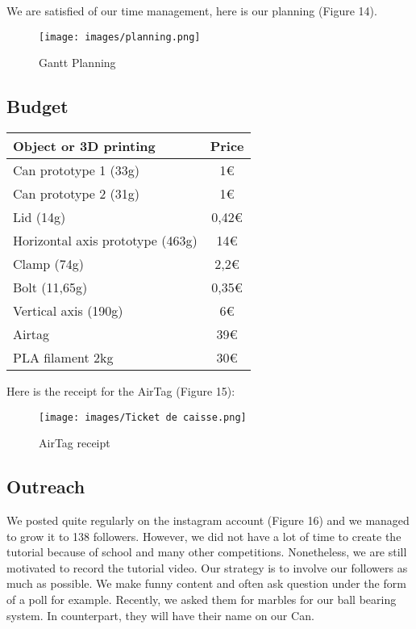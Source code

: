 \documentclass[]{article}
\begin{document}
We are satisfied of our time management, here is our planning (Figure 14). 

\begin{figure}[h] 
    \centering
    \texttt{[image: images/planning.png]} 
    \caption{Gantt Planning}
\end{figure}

\subsection{Budget}

\begin{center}
    \begin{tabular}{|l|c|}
        \hline
        \textbf{Object or 3D printing} & \textbf{Price} \\
        \hline
        Can prototype 1 (33g) & 1€ \\
        \hline
        Can prototype 2 (31g) & 1€ \\
        \hline
        Lid (14g) & 0,42€ \\
        \hline
        Horizontal axis prototype (463g) & 14€ \\
        \hline
        Clamp (74g) & 2,2€ \\
        \hline
        Bolt (11,65g) & 0,35€ \\
        \hline
        Vertical axis (190g) & 6€ \\
        \hline
        Airtag & 39€ \\
        \hline
        PLA filament 2kg & 30€ \\
        \hline
    \end{tabular}
\end{center}

Here is the receipt for the AirTag (Figure 15):

\begin{figure}[h] 
    \centering
    \texttt{[image: images/Ticket de caisse.png]} 
    \caption{AirTag receipt}
\end{figure}

\subsection{Outreach}

We posted quite regularly on the instagram account (Figure 16) and we  managed to grow it to 138 followers.
However, we did not have a lot of time to create the tutorial because of school and many other 
competitions. Nonetheless, we are still motivated to record the tutorial video. Our strategy is 
to involve our followers as much as possible. We make funny content and often ask question under 
the form of a poll for example. Recently, we asked them for marbles for our ball bearing system. In
counterpart, they will have their name on our Can. 
\end{document}
